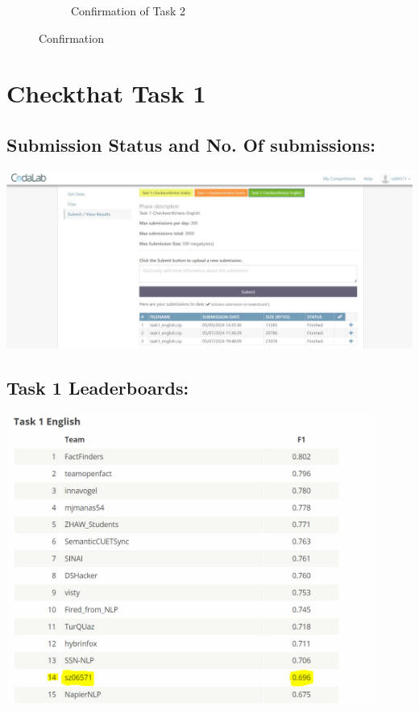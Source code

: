 \documentclass{article}
\begin{document}
\begin{figure}[h!]
\begin{subfigure}[b]{0.45\textwidth}
        \caption{Confirmation of Task 2}
        \label{fig:img2}
    \end{subfigure}
    \caption{Confirmation}
    \label{fig:combined}
\end{figure}

\section{\textcolor{sectioncolor}{Checkthat Task 1}}

\subsection{Submission Status and No. Of submissions:}
\includegraphics[width=15cm]{Task1_Status.jpg}

\subsection{Task 1 Leaderboards:}
\includegraphics[width=12cm]{Task1_LeaderBoards.png}

\newpage
\end{document}
